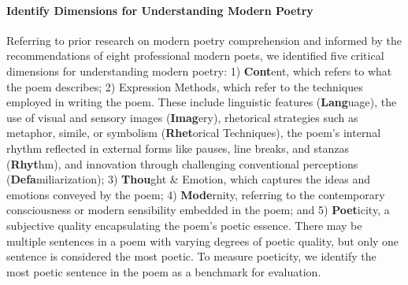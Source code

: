 \documentclass[11pt]{article}
\begin{document}






\paragraph{Identify Dimensions for Understanding Modern Poetry}



Referring to prior research on modern poetry comprehension \cite{ChangYinabrieflytalks2012} and informed by the recommendations of eight professional modern poets, we identified five critical dimensions for understanding modern poetry: 1) \textbf{Cont}ent, which refers to what the poem describes; 2) Expression Methods, which refer to the techniques employed in writing the poem. These include linguistic features (\textbf{Lang}uage), the use of visual and sensory images (\textbf{Imag}ery), rhetorical strategies such as metaphor, simile, or symbolism (\textbf{Rhet}orical Techniques), the poem's internal rhythm reflected in external forms like pauses, line breaks, and stanzas (\textbf{Rhyt}hm), and innovation through challenging conventional perceptions (\textbf{Defa}miliarization); 3) \textbf{Thou}ght \& Emotion, which captures the ideas and emotions conveyed by the poem; 4) \textbf{Mode}rnity, referring to the contemporary consciousness or modern sensibility embedded in the poem; and 5) \textbf{Poet}icity, a subjective quality encapsulating the poem's poetic essence. There may be multiple sentences in a poem with varying degrees of poetic quality, but only one sentence is considered the most poetic. To measure poeticity, we identify the most poetic sentence in the poem as a benchmark for evaluation.
\end{document}
